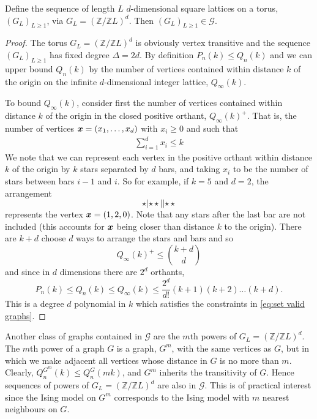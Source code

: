 \begin{lemma}
	Define the sequence of length $L$ $d$-dimensional square lattices on a torus, $(G_L)_{L \geq 1}$, via $G_L = (\mathbb{Z}/\mathbb{Z} L)^d$. Then $(G_L)_{L \geq 1} \in \mathscr{G}$.
\end{lemma}
\begin{proof}
	The torus $G_L = (\mathbb{Z}/\mathbb{Z}L)^d$ is obviously vertex transitive and the sequence $(G_L)_{L \geq 1}$ has fixed degree $\Delta = 2d$. By definition $P_n(k) \leq Q_n(k)$ and we can upper bound $Q_n(k)$ by the number of vertices contained within distance $k$ of the origin on the infinite $d$-dimensional integer lattice, $Q_\infty(k)$.

	To bound $Q_\infty(k)$, consider first the number of vertices contained within distance $k$ of the origin in the closed positive orthant, $Q_\infty(k)^+$. That is, the number of vertices ${\bm{{x}}} = (x_1, \dots, x_d)$ with $x_i \geq 0$ and such that
	\begin{align}
		\sum_{i = 1}^d x_i \leq k
	\end{align}
	We note that we can represent each vertex in the positive orthant within distance $k$ of the origin by $k$ stars separated by $d$ bars, and taking $x_i$ to be the number of stars between bars $i-1$ and $i$. So for example, if $k = 5$ and $d = 2$, the arrangement
	\begin{equation}
		\star | \star \star | | \star \star
	\end{equation}
	represents the vertex ${\bm{{x}}} = (1, 2, 0)$. Note that any stars after the last bar are not included (this accounts for ${\bm{{x}}}$ being closer than distance $k$ to the origin). There are $k + d$ choose $d$ ways to arrange the stars and bars and so
	\begin{equation}
		Q_\infty(k)^+ \leq \binom{k+d}{d}
	\end{equation}
	and since in $d$ dimensions there are $2^d$ orthants,
	\begin{equation}
		P_n(k) \leq Q_n(k) \leq Q_\infty(k) \leq \frac{2^d}{d!} (k+1)(k+2)\dots(k+d).
	\end{equation}
	This is a degree $d$ polynomial in $k$ which satisfies the constraints in \eqref{eq:set valid graphs}.
\end{proof}

Another class of graphs contained in $\mathscr{G}$ are the $m$th powers of $G_L = (\mathbb{Z}/\mathbb{Z} L)^d$.	The $m$th power of a graph $G$ is a graph, $G^m$, with the same vertices as $G$, but in which we make adjacent all vertices whose distance in $G$ is no more than $m$. Clearly, $Q_n^{G^m}(k) \leq Q_n^G(mk)$, and $G^m$ inherits the transitivity of $G$. Hence sequences of powers of $G_L = (\mathbb{Z}/\mathbb{Z}L)^d$ are also in $\mathscr{G}$. This is of practical interest since the Ising model on $G^m$ corresponds to the Ising model with $m$ nearest neighbours on $G$.

